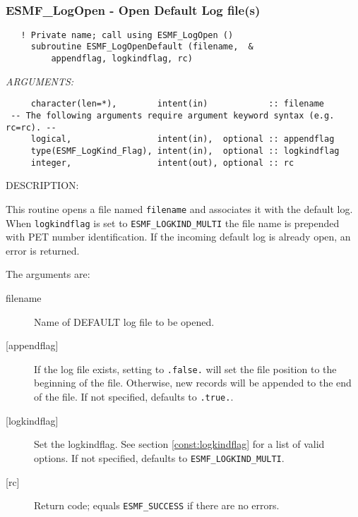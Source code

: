  
\mbox{}\hrulefill\ 
 
\subsubsection [ESMF\_LogOpen] {ESMF\_LogOpen - Open Default Log file(s)}


 
\begin{verbatim}   ! Private name; call using ESMF_LogOpen ()
     subroutine ESMF_LogOpenDefault (filename,  &
         appendflag, logkindflag, rc)\end{verbatim}{\em ARGUMENTS:}
\begin{verbatim}     character(len=*),        intent(in)            :: filename
 -- The following arguments require argument keyword syntax (e.g. rc=rc). --
     logical,                 intent(in),  optional :: appendflag
     type(ESMF_LogKind_Flag), intent(in),  optional :: logkindflag
     integer,                 intent(out), optional :: rc
 \end{verbatim}
{\sf DESCRIPTION:\\ }


        This routine opens a file named {\tt filename} and associates
        it with the default log.  When {\tt logkindflag} is set to
        {\tt ESMF\_LOGKIND\_MULTI} the file name is prepended with PET
        number identification.  If the incoming default log is already open,
        an error is returned.
  
        The arguments are:
        \begin{description}
        \item [filename]
              Name of DEFAULT log file to be opened.
        \item [{[appendflag]}]
              If the log file exists, setting to {\tt .false.} will set the file position
              to the beginning of the file.  Otherwise, new records will be appended to the
              end of the file.  If not specified, defaults to {\tt .true.}.
        \item [{[logkindflag]}]
              Set the logkindflag. See section \ref{const:logkindflag} for a list of
              valid options.
              If not specified, defaults to {\tt ESMF\_LOGKIND\_MULTI}.
        \item [{[rc]}]
              Return code; equals {\tt ESMF\_SUCCESS} if there are no errors.
        \end{description}
   
